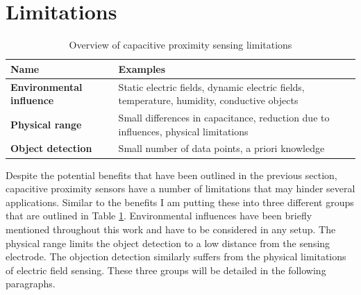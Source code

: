 \section{Limitations}
\begin{table}[htbp]
  \centering
  \caption{Overview of capacitive proximity sensing limitations}
    \begin{tabular}{p{4cm}p{6cm}}
    \toprule
    \textbf{Name} & \textbf{Examples} \\
    \midrule
    \textbf{Environmental influence} & Static electric fields, dynamic electric fields, temperature, humidity, conductive objects \\
    \textbf{Physical range} & Small differences in capacitance, reduction due to influences, physical limitations \\
    \textbf{Object detection} & Small number of data points, a priori knowledge \\
    \bottomrule
    \end{tabular}%
  \label{tab:cap_limitations}%
\end{table}%

Despite the potential benefits that have been outlined in the previous section, capacitive proximity sensors have a number of limitations that may hinder several applications. 
Similar to the benefits I am putting these into three different groups that are outlined in Table \ref{tab:cap_limitations}. Environmental influences have been briefly mentioned throughout this work and have to be considered in any setup. The physical range limits the object detection to a low distance from the sensing electrode. The objection detection similarly suffers from the physical limitations of electric field sensing. These three groups will be detailed in the following paragraphs. 
